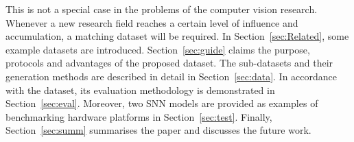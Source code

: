 This is not a special case in the problems of the computer vision research.
Whenever a new research field reaches a certain level of influence and accumulation, a matching dataset will be required.
In Section~\ref{sec:Related}, some example datasets are introduced.
Section~\ref{sec:guide} claims the purpose, protocols and advantages of the proposed dataset.
The sub-datasets and their generation methods are described in detail in Section~\ref{sec:data}.
In accordance with the dataset, its evaluation methodology is demonstrated in Section~\ref{sec:eval}.
Moreover, two SNN models are provided as examples of benchmarking hardware platforms in Section~\ref{sec:test}.
Finally, Section~\ref{sec:summ} summarises the paper and discusses the future work.
